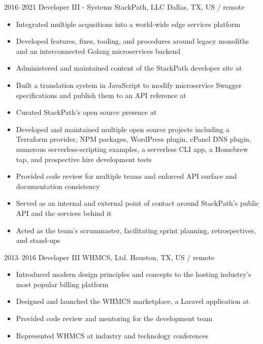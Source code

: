 \documentclass[11pt,a4paper,sans]{moderncv}
\begin{document}
  \cventry
    {2016--2021}
    {Developer III - Systems}
    {StackPath, LLC}
    {Dallas, TX, US / remote}
    {}
    {
      \begin{itemize}
        \item Integrated multiple acqusitions into a world-wide edge services platform
        \item Developed features, fixes, tooling, and procedures around legacy monoliths and an interconnected Golang microservices backend
        \item Administered and maintained content of the StackPath developer site at 
        \item Built a translation system in JavaScript to modify microservice Swagger specifications and publish them to an API reference at 
        \item Curated StackPath's open source presence at 
        \item Developed and maintained multiple open source projects including a Terraform provider, NPM packages, WordPress plugin, cPanel DNS plugin, numerous serverless-scripting examples, a serverless CLI app, a Homebrew tap, and prospective hire development tests
        \item Provided code review for multiple teams and enforced API surface and documentation consistency
        \item Served as an internal and external point of contact around StackPath's public API and the services behind it
        \item Acted as the team's scrummaster, facilitating sprint planning, retrospectives, and stand-ups
      \end{itemize}
    }

  \cventry
    {2013--2016}
    {Developer III}
    {WHMCS, Ltd.}
    {Houston, TX, US / remote}
    {}
    {
      \begin{itemize}
        \item Introduced modern design principles and concepts to the hosting industry's most popular billing platform
        \item Designed and launched the WHMCS marketplace, a Laravel application at 
        \item Provided code review and mentoring for the development team
        \item Represented WHMCS at industry and technology conferences
      \end{itemize}
    }
\end{document}
